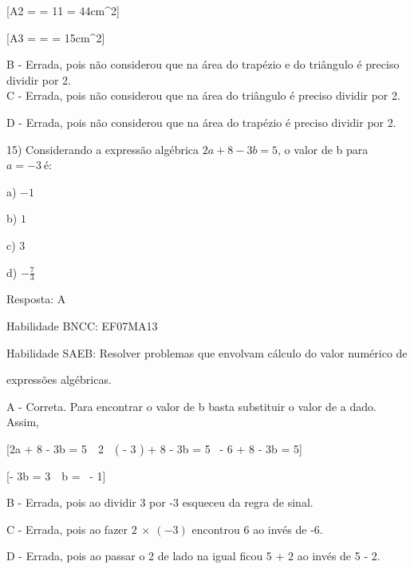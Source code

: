 [A2 =  = 11  = 44cm^{2}]

[A3 =  =  = 15cm^{2}]



B - Errada, pois não considerou que na área do trapézio e do triângulo é
preciso dividir por 2.\\
C - Errada, pois não considerou que na área do triângulo é preciso
dividir por 2.

D - Errada, pois não considerou que na área do trapézio é preciso
dividir por 2.

15) Considerando a expressão algébrica \(2a + 8 - 3b = 5\), o valor de b
para \(a = - 3\ \)é:

a) \(- 1\)

b) \(1\)

c) \(3\)

d) \(- \frac{7}{3}\)

Resposta: A

Habilidade BNCC: EF07MA13

Habilidade SAEB: Resolver problemas que envolvam cálculo do valor
numérico de

expressões algébricas.

A - Correta. Para encontrar o valor de b basta substituir o valor de a
dado. Assim,

[2a + 8 - 3b = 5\  \rightarrow \ 2\  \times \ \left( - 3 \right) + 8 - 3b = 5 \rightarrow \  - 6 + 8 - 3b = 5]

[- 3b = 3\  \rightarrow \ b = \  - 1]

B - Errada, pois ao dividir 3 por -3 esqueceu da regra de sinal.

C - Errada, pois ao fazer \(2\  \times \ \left( - 3 \right)\) encontrou
6 ao invés de -6.

D - Errada, pois ao passar o 2 de lado na igual ficou 5 + 2 ao invés de
5 - 2.

